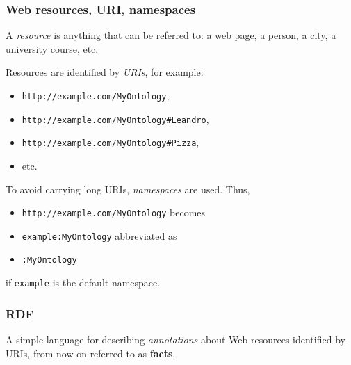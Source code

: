 \documentclass{beamer}
\begin{document}
\begin{frame}
  \frametitle{Web resources, URI, namespaces}

  \pause

  A \textit{resource} is anything that can be referred to: a web page, a
  person, a city, a university course, etc.

  \pause

  \medskip

  Resources are identified by \textit{URIs}, for example:

  \begin{itemize}
    \item \texttt{http://example.com/MyOntology},
    \item \texttt{http://example.com/MyOntology\#Leandro},
    \item \texttt{http://example.com/MyOntology\#Pizza},
    \item etc.
  \end{itemize}

  \pause

  To avoid carrying long URIs, \textit{namespaces} are used. \pause Thus,

  \pause

  \begin{itemize}
    \item \texttt{http://example.com/MyOntology} \pause \hfill becomes

    \pause

    \item \texttt{example:MyOntology} \pause \hfill abbreviated as

    \pause

    \item \texttt{:MyOntology}
  \end{itemize}

  \pause

  if \texttt{example} is the default namespace.
\end{frame}

\begin{frame}
  \frametitle{RDF}

  A simple language for describing \textit{annotations} about Web resources
  identified by URIs, from now on referred to as \textbf{facts}.
\end{frame}
\end{document}

